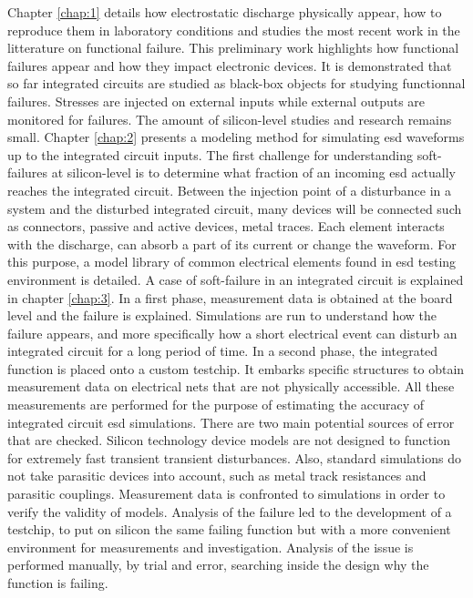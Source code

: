 %
Chapter \ref{chap:1} details how electrostatic discharge physically appear, how to reproduce them in laboratory conditions and studies the most recent work in the litterature on functional failure.
This preliminary work highlights how functional failures appear and how they impact electronic devices.
It is demonstrated that so far integrated circuits are studied as black-box objects for studying functionnal failures.
Stresses are injected on external inputs while external outputs are monitored for failures.
The amount of silicon-level studies and research remains small.
%
Chapter \ref{chap:2} presents a modeling method for simulating \gls{esd} waveforms up to the integrated circuit inputs.
The first challenge for understanding soft-failures at silicon-level is to determine what fraction of an incoming \gls{esd} actually reaches the integrated circuit.
Between the injection point of a disturbance in a system and the disturbed integrated circuit, many devices will be connected such as connectors, passive and active devices, metal traces.
Each element interacts with the discharge, can absorb a part of its current or change the waveform.
For this purpose, a model library of common electrical elements found in \gls{esd} testing environment is detailed.
%
A case of soft-failure in an integrated circuit is explained in chapter \ref{chap:3}.
In a first phase, measurement data is obtained at the board level and the failure is explained.
Simulations are run to understand how the failure appears, and more specifically how a short electrical event can disturb an integrated circuit for a long period of time.
In a second phase, the integrated function is placed onto a custom testchip.
It embarks specific structures to obtain measurement data on electrical nets that are not physically accessible.
All these measurements are performed for the purpose of estimating the accuracy of integrated circuit \gls{esd} simulations.
There are two main potential sources of error that are checked.
Silicon technology device models are not designed to function for extremely fast transient transient disturbances.
Also, standard simulations do not take parasitic devices into account, such as metal track resistances and parasitic couplings.
Measurement data is confronted to simulations in order to verify the validity of models.
Analysis of the failure led to the development of a testchip, to put on silicon the same failing function but with a more convenient environment for measurements and investigation.
%
Analysis of the issue is performed manually, by trial and error, searching inside the design why the function is failing.
